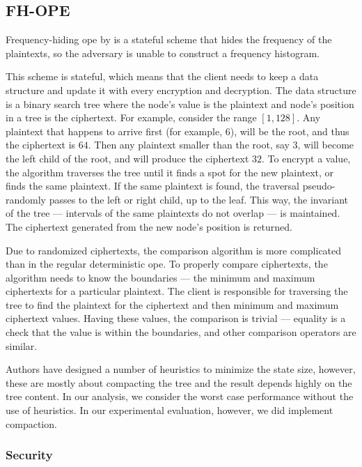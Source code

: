 \subsection{FH-OPE \texorpdfstring{\cite{fh-ope}}{}}

	Frequency-hiding \acrshort{ope} by \textcite{fh-ope} is a stateful scheme that hides the frequency of the plaintexts, so the adversary is unable to construct a frequency histogram.

	This scheme is stateful, which means that the client needs to keep a data structure and update it with every encryption and decryption.
	The data structure is a binary search tree where the node's value is the plaintext and node's position in a tree is the ciphertext.
	For example, consider the range $[1, 128]$.
	Any plaintext that happens to arrive first (for example, $6$), will be the root, and thus the ciphertext is $64$.
	Then any plaintext smaller than the root, say $3$, will become the left child of the root, and will produce the ciphertext $32$.
	To encrypt a value, the algorithm traverses the tree until it finds a spot for the new plaintext, or finds the same plaintext.
	If the same plaintext is found, the traversal pseudo-randomly passes to the left or right child, up to the leaf.
	This way, the invariant of the tree --- intervals of the same plaintexts do not overlap --- is maintained.
	The ciphertext generated from the new node's position is returned.

	Due to randomized ciphertexts, the comparison algorithm is more complicated than in the regular deterministic \acrshort{ope}.
	To properly compare ciphertexts, the algorithm needs to know the boundaries --- the minimum and maximum ciphertexts for a particular plaintext.
	The client is responsible for traversing the tree to find the plaintext for the ciphertext and then minimum and maximum ciphertext values.
	Having these values, the comparison is trivial --- equality is a check that the value is within the boundaries, and other comparison operators are similar.

	Authors have designed a number of heuristics to minimize the state size, however, these are mostly about compacting the tree and the result depends highly on the tree content.
	In our analysis, we consider the worst case performance without the use of heuristics.
	In our experimental evaluation, however, we did implement compaction.

	\subsubsection{Security}

